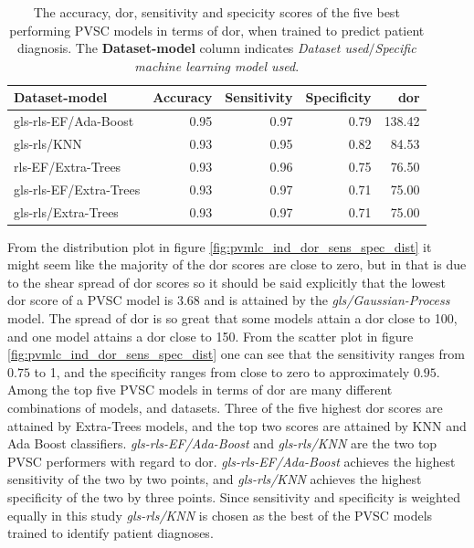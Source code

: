 \begin{table}
    \centering
    \begin{tabular}{lrrrr}
        \toprule
        Dataset-model          &  Accuracy &  Sensitivity &  Specificity &  \acrshort{dor} \\
        \midrule
        gls-rls-EF/Ada-Boost   &      0.95 &         0.97 &         0.79 & 138.42 \\
        gls-rls/KNN            &      0.93 &         0.95 &         0.82 &  84.53 \\
        rls-EF/Extra-Trees     &      0.93 &         0.96 &         0.75 &  76.50 \\
        gls-rls-EF/Extra-Trees &      0.93 &         0.97 &         0.71 &  75.00 \\
        gls-rls/Extra-Trees    &      0.93 &         0.97 &         0.71 &  75.00 \\
        \bottomrule
    \end{tabular}
    \caption{The accuracy, \acrshort{dor}, sensitivity and specicity scores of the five best performing PVSC models in terms of \acrshort{dor}, when trained to predict patient diagnosis.
             The \textbf{Dataset-model} column indicates \textit{Dataset used}$/$\textit{Specific machine learning model used}.}
    \label{tab:pvsc_hf_dor_sens_spec_dist}
\end{table}

From the distribution plot in figure \ref{fig:pvmlc_ind_dor_sens_spec_dist} it might seem like the majority of the \acrshort{dor} scores are close to zero, but in that is due to the shear spread of \acrshort{dor} scores so it should be said explicitly that the lowest \acrshort{dor} score of a PVSC model is 3.68 and is attained by the \textit{gls/Gaussian-Process} model.
The spread of \acrshort{dor} is so great that some models attain a \acrshort{dor} close to 100, and one model attains a \acrshort{dor} close to 150.
From the scatter plot in figure \ref{fig:pvmlc_ind_dor_sens_spec_dist} one can see that the sensitivity ranges from $0.75$ to 1, and the specificity ranges from 
close to zero to approximately $0.95$. 
Among the top five PVSC models in terms of \acrshort{dor} are many different combinations of models, and datasets. 
Three of the five highest \acrshort{dor} scores are attained by Extra-Trees models, and the top two scores are attained by KNN and Ada Boost classifiers. 
\textit{gls-rls-EF/Ada-Boost} and \textit{gls-rls/KNN} are the two top PVSC performers with regard to \acrshort{dor}.
\textit{gls-rls-EF/Ada-Boost} achieves the highest sensitivity of the two by two points, and \textit{gls-rls/KNN} achieves the highest specificity of the two by three points.
Since sensitivity and specificity is weighted equally in this study \textit{gls-rls/KNN} is chosen as the best of the PVSC models trained to identify patient diagnoses.


